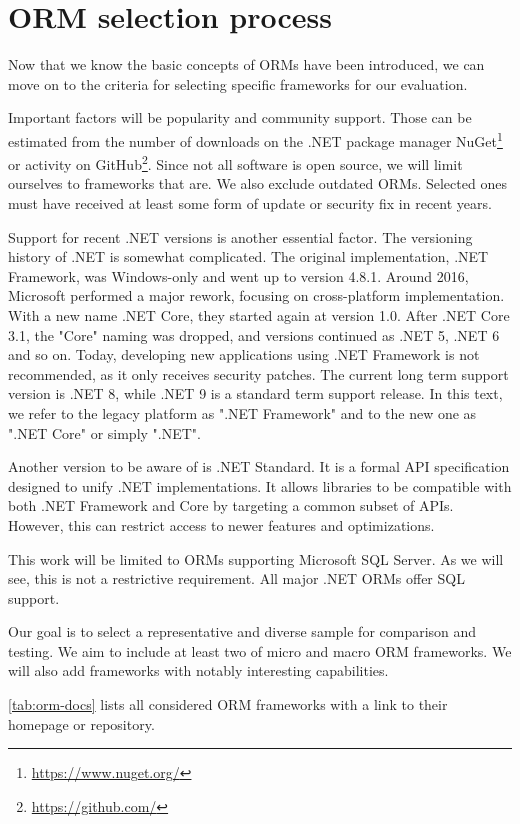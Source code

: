 \section{ORM selection process}
Now that we know the basic concepts of ORMs have been introduced, we can move on to the criteria for selecting specific frameworks for our evaluation.

Important factors will be popularity and community support. Those can be estimated from the number of downloads on the .NET package manager NuGet\footnote{\url{https://www.nuget.org/}} or activity on GitHub\footnote{\url{https://github.com/}}. Since not all software is open source, we will limit ourselves to frameworks that are. We also  exclude outdated ORMs. Selected ones must have received at least some form of update or security fix in recent years.

Support for recent .NET versions is another essential factor. The versioning history of .NET is somewhat complicated. The original implementation, .NET Framework, was Windows-only and went up to version 4.8.1. Around 2016, Microsoft performed a major rework, focusing on cross-platform implementation. With a new name .NET Core, they started again at version 1.0. After .NET Core 3.1, the "Core" naming was dropped, and versions continued as .NET 5, .NET 6 and so on. Today, developing new applications using .NET Framework is not recommended, as it only receives security patches. The current long term support version is .NET 8, while .NET 9 is a standard term support release. In this text, we refer to the legacy platform as ".NET Framework" and to the new one as ".NET Core" or simply ".NET". \cite{NETFrameworkVersions}\cite{NETversions}

Another version to be aware of is .NET Standard. It is a formal API specification designed to unify .NET implementations. It allows libraries to be compatible with both .NET Framework and Core by targeting a common subset of APIs. However, this can restrict access to newer features and optimizations. \cite{NETStandard}

This work will be limited to ORMs supporting Microsoft SQL Server. As we will see, this is not a restrictive requirement. All major .NET ORMs offer SQL support.

Our goal is to select a representative and diverse sample for comparison and testing. We aim to include at least two of micro and macro ORM frameworks. We will also add frameworks with notably interesting capabilities.

\autoref{tab:orm-docs} lists all considered ORM frameworks with a link to their homepage or repository.

